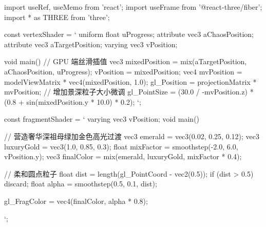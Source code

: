 import { useRef, useMemo } from 'react';
import { useFrame } from '@react-three/fiber';
import * as THREE from 'three';

const vertexShader = `
  uniform float uProgress;
  attribute vec3 aChaosPosition;
  attribute vec3 aTargetPosition;
  varying vec3 vPosition;
  
  void main() {
    // GPU 端丝滑插值
    vec3 mixedPosition = mix(aTargetPosition, aChaosPosition, uProgress);
    vPosition = mixedPosition;
    vec4 mvPosition = modelViewMatrix * vec4(mixedPosition, 1.0);
    gl_Position = projectionMatrix * mvPosition;
    // 增加景深粒子大小微调
    gl_PointSize = (30.0 / -mvPosition.z) * (0.8 + sin(mixedPosition.y * 10.0) * 0.2);
  }
`;

const fragmentShader = `
  varying vec3 vPosition;
  void main() {
    // 营造奢华深祖母绿加金色高光过渡
    vec3 emerald = vec3(0.02, 0.25, 0.12);
    vec3 luxuryGold = vec3(1.0, 0.85, 0.3);
    float mixFactor = smoothstep(-2.0, 6.0, vPosition.y);
    vec3 finalColor = mix(emerald, luxuryGold, mixFactor * 0.4);
    
    // 柔和圆点粒子
    float dist = length(gl_PointCoord - vec2(0.5));
    if (dist > 0.5) discard;
    float alpha = smoothstep(0.5, 0.1, dist);
    
    gl_FragColor = vec4(finalColor, alpha * 0.8);
  }
`;

